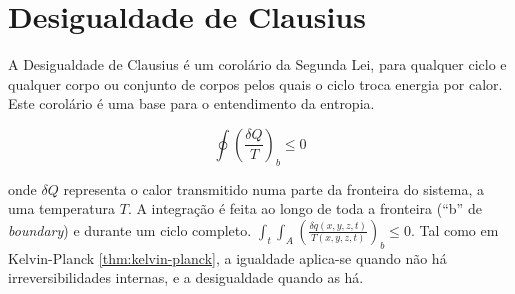 \section{Desigualdade de Clausius}

A Desigualdade de Clausius é um corolário da Segunda Lei, para qualquer ciclo e qualquer corpo ou conjunto de corpos pelos quais o ciclo troca energia por calor. Este corolário é uma base para o entendimento da entropia.

\begin{equation}
    \oint \left( \frac{\delta Q}{T} \right)_b \leq 0 
\end{equation}

onde $\delta Q$ representa o calor transmitido numa parte da fronteira do sistema, a uma temperatura $T$. A integração é feita ao longo de toda a fronteira (``b'' de \textit{boundary}) e durante um ciclo completo. $\int_t \int_A \left( \frac{\delta q (x,y,z,t)}{T(x,y,z,t)} \right)_b \leq 0$.
Tal como em Kelvin-Planck \autoref{thm:kelvin-planck}, a igualdade aplica-se quando não há irreversibilidades internas, e a desigualdade quando as há.

